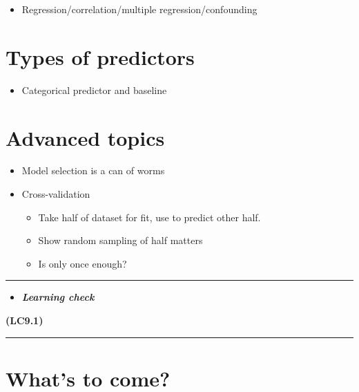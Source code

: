 \documentclass[]{tufte-book}
\let\oldrule=\rule
\renewcommand{\rule}[1]{\oldrule{\linewidth}}
\providecommand{\tightlist}{%
  \setlength{\itemsep}{0pt}\setlength{\parskip}{0pt}}
\newenvironment{rmdblock}[1]
  {\begin{shaded*}
  \begin{itemize}
  \renewcommand{\labelitemi}{
    \raisebox{-.7\height}[0pt][0pt]{
    }
  }
  \item
  }
  {
  \end{itemize}
  \end{shaded*}
  }
\newenvironment{learncheck}
  {\begin{rmdblock}{warning}}
  {\end{rmdblock}}
\begin{document}
\begin{itemize}
\tightlist
\item
  Regression/correlation/multiple regression/confounding
\end{itemize}

\section{Types of predictors}\label{types-of-predictors}

\begin{itemize}
\tightlist
\item
  Categorical predictor and baseline
\end{itemize}

\section{Advanced topics}\label{advanced-topics}

\begin{itemize}
\tightlist
\item
  Model selection is a can of worms
\item
  Cross-validation

  \begin{itemize}
  \tightlist
  \item
    Take half of dataset for fit, use to predict other half.
  \item
    Show random sampling of half matters
  \item
    Is only once enough?
  \end{itemize}
\end{itemize}

\begin{center}\rule{\linewidth}{\linethickness}\end{center}

\begin{learncheck}
\textbf{\emph{Learning check}}
\end{learncheck}

\textbf{(LC9.1)}

\begin{center}\rule{\linewidth}{\linethickness}\end{center}

\section{What's to come?}\label{whats-to-come-6}
\end{document}
